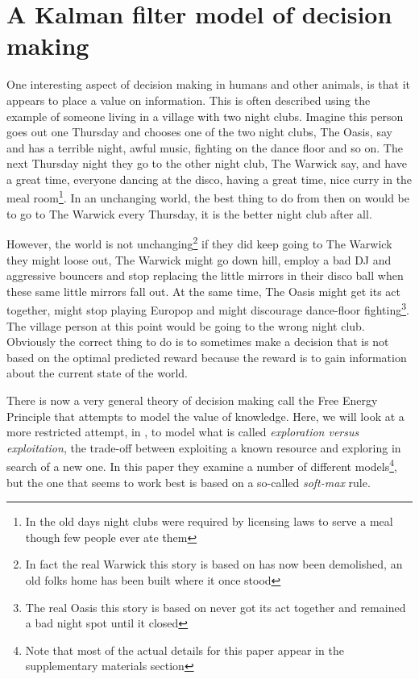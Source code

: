 \documentclass[12pt]{article}
\begin{document}
\section*{A Kalman filter model of decision making}

One interesting aspect of decision making in humans and other animals,
is that it appears to place a value on information. This is often
described using the example of someone living in a village with two
night clubs. Imagine this person goes out one Thursday and chooses one
of the two night clubs, The Oasis, say and has a terrible night, awful
music, fighting on the dance floor and so on. The next Thursday night
they go to the other night club, The Warwick say, and have a great
time, everyone dancing at the disco, having a great time, nice curry
in the meal room\footnote{In the old days night clubs were required by
  licensing laws to serve a meal though few people ever ate them}. In
an unchanging world, the best thing to do from then on would be to go
to The Warwick every Thursday, it is the better night club after all.

However, the world is not unchanging\footnote{In fact the real Warwick
  this story is based on has now been demolished, an old folks home
  has been built where it once stood} if they did keep going to The
Warwick they might loose out, The Warwick might go down hill, employ a
bad DJ and aggressive bouncers and stop replacing the little mirrors
in their disco ball when these same little mirrors fall out. At the
same time, The Oasis might get its act together, might stop playing
Europop and might discourage dance-floor fighting\footnote{The real
  Oasis this story is based on never got its act together and remained
  a bad night spot until it closed}. The village person at this point
would be going to the wrong night club. Obviously the correct thing to
do is to sometimes make a decision that is not based on the optimal
predicted reward because the reward is to gain information about the
current state of the world.

There is now a very general theory of decision making call the Free
Energy Principle that attempts to model the value of knowledge. Here,
we will look at a more restricted attempt, in \citet{DawEtAl2006}, to
model what is called \textsl{exploration versus exploitation}, the
trade-off between exploiting a known resource and exploring in search
of a new one. In this paper they examine a number of different
models\footnote{Note that most of the actual details for this paper
  appear in the supplementary materials section}, but the one that
seems to work best is based on a so-called \textsl{soft-max} rule.
\end{document}
